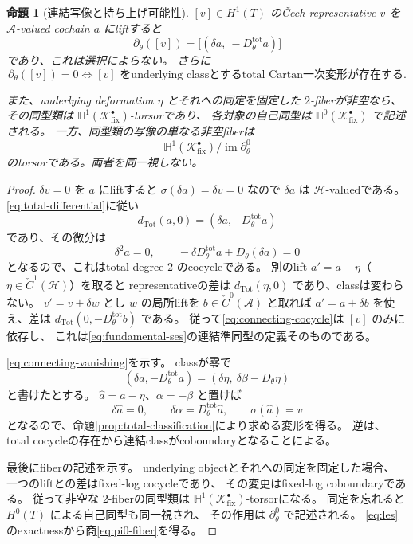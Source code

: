 \documentclass[uplatex,dvipdfmx,11pt]{jsarticle}
\numberwithin{equation}{section}
\theoremstyle{plain}
\newtheorem{proposition}[theorem]{命題}
\theoremstyle{definition}
\theoremstyle{remark}
\DeclareMathOperator{\im}{im}
\newcommand{\shH}{\mathcal H}
\newcommand{\shA}{\mathcal A}
\newcommand{\Kfix}{\mathcal K_{\mathrm{fix}}^\bullet}
\newcommand{\Dtot}{D_\theta^{\mathrm{tot}}}
\newcommand{\Hyp}{\mathbb H}
\begin{document}
\begin{proposition}[連結写像と持ち上げ可能性]
\label{prop:relative-obstruction}
\([v]\in H^1(T)\) のČech representative \(v\) を
\(\shA\)-valued cochain \(a\) にliftすると
\begin{equation}
\label{eq:connecting-cocycle}
\partial_\theta([v])=\bigl[(\delta a,\ -\Dtot a)\bigr]
\end{equation}
であり、これは選択によらない。
さらに
\begin{equation}
\label{eq:connecting-vanishing}
\partial_\theta([v])=0
\iff
[v]\text{ をunderlying classとするtotal Cartan一次変形が存在する}.
\end{equation}

また、underlying deformation \(\eta\) とそれへの同定を固定した
\(2\)-fiberが非空なら、その同型類は \(\Hyp^1(\Kfix)\)-torsorであり、
各対象の自己同型は \(\Hyp^0(\Kfix)\) で記述される。
一方、同型類の写像の単なる非空fiberは
\begin{equation}
\label{eq:pi0-fiber}
\Hyp^1(\Kfix)\big/\im\partial_\theta^0
\end{equation}
のtorsorである。両者を同一視しない。
\end{proposition}

\begin{proof}
\(\delta v=0\) を \(a\) にliftすると \(\sigma(\delta a)=\delta v=0\) なので
\(\delta a\) は \(\shH\)-valuedである。
\eqref{eq:total-differential}に従い
\[
d_{\mathrm{Tot}}(a,0)=(\delta a,-\Dtot a)
\]
であり、その微分は
\[
\delta^2a=0,\qquad
-\delta\Dtot a+D_\theta(\delta a)=0
\]
となるので、これはtotal degree \(2\) のcocycleである。
別のlift \(a'=a+\eta\)（\(\eta\in\check C^1(\shH)\)）を取ると
representativeの差は \(d_{\mathrm{Tot}}(\eta,0)\) であり、classは変わらない。
\(v'=v+\delta w\) とし \(w\) の局所liftを \(b\in\check C^0(\shA)\) と取れば
\(a'=a+\delta b\) を使え、差は \(d_{\mathrm{Tot}}(0,-\Dtot b)\) である。
従って\eqref{eq:connecting-cocycle}は \([v]\) のみに依存し、
これは\eqref{eq:fundamental-ses}の連結準同型の定義そのものである。

\eqref{eq:connecting-vanishing}を示す。
classが零で
\[
(\delta a,-\Dtot a)=(\delta\eta,\ \delta\beta-D_\theta\eta)
\]
と書けたとする。
\(\widehat a=a-\eta\)、\(\alpha=-\beta\) と置けば
\[
\delta\widehat a=0,\qquad
\delta\alpha=\Dtot\widehat a,\qquad
\sigma(\widehat a)=v
\]
となるので、命題\ref{prop:total-classification}により求める変形を得る。
逆は、total cocycleの存在から連結classがcoboundaryとなることによる。

最後にfiberの記述を示す。
underlying objectとそれへの同定を固定した場合、
一つのliftとの差はfixed-log cocycleであり、
その変更はfixed-log coboundaryである。
従って非空な \(2\)-fiberの同型類は \(\Hyp^1(\Kfix)\)-torsorになる。
同定を忘れると \(H^0(T)\) による自己同型も同一視され、
その作用は \(\partial_\theta^0\) で記述される。
\eqref{eq:les}のexactnessから商\eqref{eq:pi0-fiber}を得る。
\end{proof}
\end{document}

